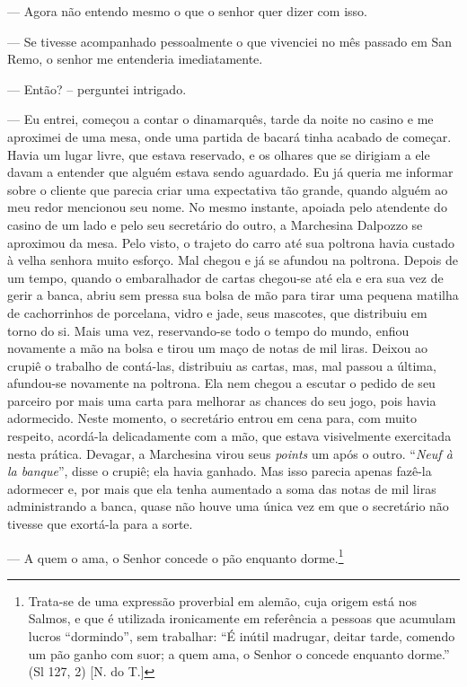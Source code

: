 --- Agora não entendo mesmo o que o senhor quer dizer com isso.

--- Se tivesse acompanhado pessoalmente o que vivenciei no mês passado em
San Remo, o senhor me entenderia imediatamente.

--- Então? -- perguntei intrigado.

--- Eu entrei, começou a contar o dinamarquês, tarde da noite no casino e
me aproximei de uma mesa, onde uma partida de bacará tinha acabado de
começar. Havia um lugar livre, que estava reservado, e os olhares que se
dirigiam a ele davam a entender que alguém estava sendo aguardado. Eu já
queria me informar sobre o cliente que parecia criar uma expectativa tão
grande, quando alguém ao meu redor mencionou seu nome. No mesmo
instante, apoiada pelo atendente do casino de um lado e pelo seu
secretário do outro, a Marchesina Dalpozzo se aproximou da mesa. Pelo
visto, o trajeto do carro até sua poltrona havia custado à velha senhora
muito esforço. Mal chegou e já se afundou na poltrona. Depois de um
tempo, quando o embaralhador de cartas chegou-se até ela e era sua vez
de gerir a banca, abriu sem pressa sua bolsa de mão para tirar uma
pequena matilha de cachorrinhos de porcelana, vidro e jade, seus
mascotes, que distribuiu em torno do si. Mais uma vez, reservando-se
todo o tempo do mundo, enfiou novamente a mão na bolsa e tirou um maço
de notas de mil liras. Deixou ao crupiê o trabalho de contá-las,
distribuiu as cartas, mas, mal passou a última, afundou-se novamente na
poltrona. Ela nem chegou a escutar o pedido de seu parceiro por mais uma
carta para melhorar as chances do seu jogo, pois havia adormecido. Neste
momento, o secretário entrou em cena para, com muito respeito, acordá-la
delicadamente com a mão, que estava visivelmente exercitada nesta
prática. Devagar, a Marchesina virou seus \emph{points} um após o outro.
``\emph{Neuf à la banque}'', disse o crupiê; ela havia ganhado. Mas isso parecia apenas fazê-la adormecer e, por mais que ela tenha aumentado a soma das notas de mil liras administrando a banca, quase não houve uma única vez em que o secretário não tivesse que exortá-la para a sorte.

--- A quem o ama, o Senhor concede o pão enquanto dorme.\footnote{Trata-se
  de uma expressão proverbial em alemão, cuja origem está nos Salmos, e
  que é utilizada ironicamente em referência a pessoas que acumulam
  lucros ``dormindo'', sem trabalhar: ``É inútil madrugar, deitar tarde,
  comendo um pão ganho com suor; a quem ama, o Senhor o concede enquanto
  dorme.'' (Sl 127, 2) [N. do T.]}

